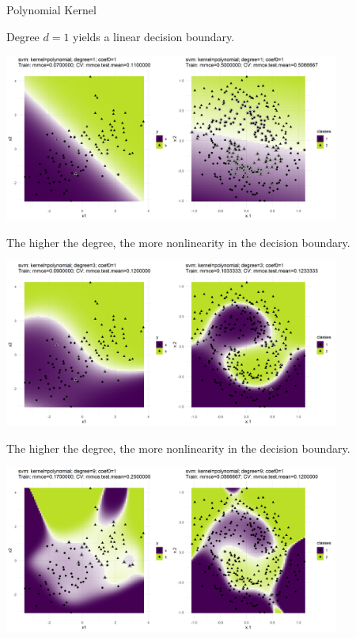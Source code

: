 \documentclass[11pt,compress,t,notes=noshow, xcolor=table]{beamer}
\begin{document}
\begin{vbframe}{Polynomial Kernel}


Degree $d = 1$ yields a linear decision boundary. 

\vspace*{0.1cm} 
\begin{center}
\includegraphics[width = 11cm]{figure/svm_poly_kernel_deg_1_coef0_1.png}
\end{center}

\framebreak

The higher the degree, the more nonlinearity in the decision boundary. 

\vspace*{0.1cm}
\begin{center}
\includegraphics[width = 11cm]{figure/svm_poly_kernel_deg_3_coef0_1.png}
\end{center}

\framebreak

The higher the degree, the more nonlinearity in the decision boundary. 
\vspace*{0.1cm}
\begin{center}
\includegraphics[width = 11cm]{figure/svm_poly_kernel_deg_9_coef0_1.png}
\end{center}


\end{vbframe}
\end{document}
